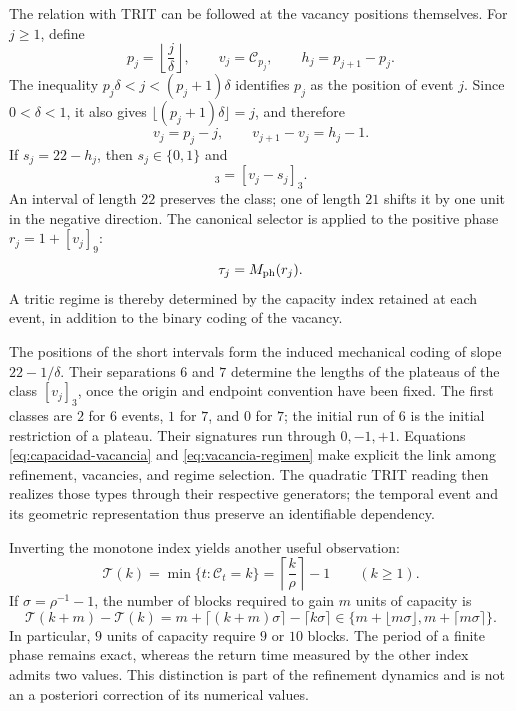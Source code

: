 The relation with TRIT can be followed at the vacancy positions themselves.
For \(j\geq1\), define
\[
 p_j=\left\lfloor\frac j\delta\right\rfloor,\qquad
 v_j=\mathcal C_{p_j},\qquad h_j=p_{j+1}-p_j.
\]
The inequality \(p_j\delta<j<(p_j+1)\delta\) identifies \(p_j\)
as the position of event \(j\). Since \(0<\delta<1\), it also gives
\(\lfloor(p_j+1)\delta\rfloor=j\), and therefore
\[
 v_j=p_j-j,\qquad
 v_{j+1}-v_j=h_j-1.
\]
If \(s_j=22-h_j\), then \(s_j\in\{0,1\}\) and
\begin{equation}
 [v_{j+1}]_3=[v_j-s_j]_3.
 \label{eq:vacancia-regimen}
\end{equation}
An interval of length \(22\) preserves the class; one of length
\(21\) shifts it by one unit in the negative direction. The canonical selector
is applied to the positive phase \(r_j=1+[v_j]_9\):
\[
 \tau_j=M_{\rm ph}(r_j).
\]
A tritic regime is thereby determined by the capacity index
retained at each event, in addition to the binary coding of the vacancy.

The positions of the short intervals form the induced mechanical coding
of slope \(22-1/\delta\). Their separations \(6\) and \(7\)
determine the lengths of the plateaus of the class \([v_j]_3\), once
the origin and endpoint convention have been fixed. The first classes
are \(2\) for \(6\) events, \(1\) for \(7\), and \(0\) for
\(7\); the initial run of \(6\) is the initial restriction of a plateau.
Their signatures run through \(0,-1,+1\). Equations
\eqref{eq:capacidad-vacancia} and \eqref{eq:vacancia-regimen} make explicit the
link among refinement, vacancies, and regime selection. The quadratic
TRIT reading then realizes those types through their respective
generators; the temporal event and its geometric representation
thus preserve an identifiable dependency.

Inverting the monotone index yields another useful observation:
\[
 \mathcal T(k)=\min\{t:\mathcal C_t=k\}
   =\left\lceil\frac k\rho\right\rceil-1\qquad(k\geq1).
\]
If \(\sigma=\rho^{-1}-1\), the number of blocks required to gain
\(m\) units of capacity is
\[
 \mathcal T(k+m)-\mathcal T(k)
 =m+\lceil(k+m)\sigma\rceil-\lceil k\sigma\rceil
 \in\{m+\lfloor m\sigma\rfloor,m+\lceil m\sigma\rceil\}.
\]
In particular, \(9\) units of capacity require \(9\) or \(10\)
blocks. The period of a finite phase remains exact, whereas the
return time measured by the other index admits two values. This
distinction is part of the refinement dynamics and is not an
a posteriori correction of its numerical values.
